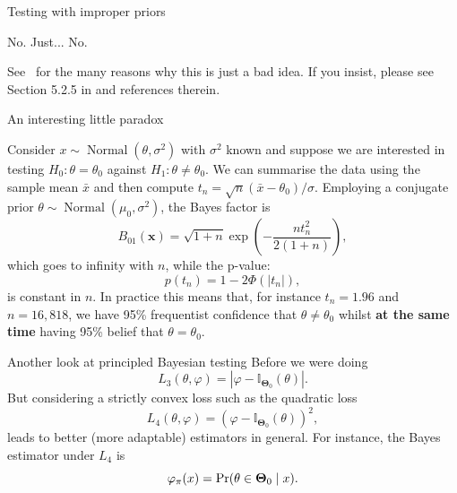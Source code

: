 \begin{frame}{Testing with improper priors}
 \begin{idea}
  No. Just... No.
 \end{idea}
See~\cite{Degroot1973} for the many reasons why this is just a bad idea.
If you insist, please see Section 5.2.5 in \cite{Robert2007} and references therein.
\end{frame}
\begin{frame}{An interesting little paradox}
\begin{idea}
Consider $x \sim \operatorname{Normal}(\theta, \sigma^2)$ with $\sigma^2$ known and suppose we are interested in testing $H_0: \theta = \theta_0$ against $H_1: \theta \neq \theta_0$.
We can summarise the data using the sample mean $\bar{x}$ and then compute $t_n = \sqrt{n}(\bar{x}-\theta_0)/\sigma$. 
Employing a conjugate prior $\theta \sim \operatorname{Normal}(\mu_0, \sigma^2)$,
the Bayes factor is
\begin{equation*}
B_{01}(\boldsymbol{x}) = \sqrt{1 + n}\exp\left(-\frac{nt_n^2}{2(1+n)}\right),
\end{equation*}
which goes to infinity with $n$, while the p-value:
\begin{equation*}
 p(t_n) = 1-2\Phi(|t_n|),
\end{equation*}
is constant in $n$.
In practice this means that, for instance $t_n = 1.96$ and $n = 16, 818$, we have 95\% frequentist confidence that $\theta \neq \theta_0$ whilst \textbf{at the same time} having 95\% belief that $\theta = \theta_0$.
\end{idea} 
\end{frame}
\begin{frame}{Another look at principled Bayesian testing}
 Before we were doing
 \begin{equation*}
  L_3(\theta, \varphi) = |\varphi - \mathbb{I}_{\boldsymbol{\Theta}_0}(\theta)|.
 \end{equation*}
But considering a strictly convex loss such as the quadratic loss 
 \begin{equation*}
  L_4(\theta, \varphi) = \left(\varphi - \mathbb{I}_{\boldsymbol{\Theta}_0}(\theta)\right)^2,
 \end{equation*}
 leads to better (more adaptable) estimators in general.
 For instance, the Bayes estimator under $L_4$ is
 \begin{equation*}
  \varphi_\pi(x) = \operatorname{Pr}(\theta \in  \boldsymbol{\Theta}_0 \mid x).
 \end{equation*}
 \end{frame}
